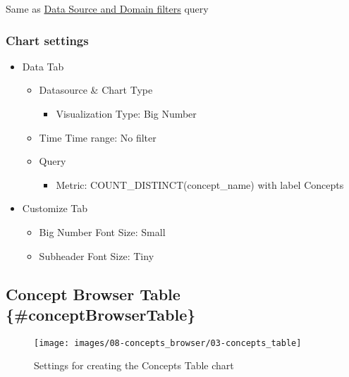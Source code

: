 \documentclass[
]{book}
\providecommand{\tightlist}{%
  \setlength{\itemsep}{0pt}\setlength{\parskip}{0pt}}
\begin{document}
Same as \protect\hyperlink{Dataux5cux2520Sourceux5cux2520andux5cux2520Domainux5cux2520Filters}{Data Source and Domain filters} query

\hypertarget{chart-settings-23}{%
\subsubsection*{Chart settings}\label{chart-settings-23}}

\begin{itemize}
\tightlist
\item
  Data Tab

  \begin{itemize}
  \tightlist
  \item
    Datasource \& Chart Type

    \begin{itemize}
    \tightlist
    \item
      Visualization Type: Big Number
    \end{itemize}
  \item
    Time
    Time range: No filter
  \item
    Query

    \begin{itemize}
    \tightlist
    \item
      Metric: COUNT\_DISTINCT(concept\_name) with label Concepts
    \end{itemize}
  \end{itemize}
\item
  Customize Tab

  \begin{itemize}
  \tightlist
  \item
    Big Number Font Size: Small
  \item
    Subheader Font Size: Tiny
  \end{itemize}
\end{itemize}

\hypertarget{concept-browser-table-conceptbrowsertable}{%
\subsection*{Concept Browser Table \{\#conceptBrowserTable\}}\label{concept-browser-table-conceptbrowsertable}}

\begin{figure}
\texttt{[image: images/08-concepts\_browser/03-concepts\_table]} \caption{Settings for creating the Concepts Table chart}\label{fig:conceptsTable}
\end{figure}
\end{document}
